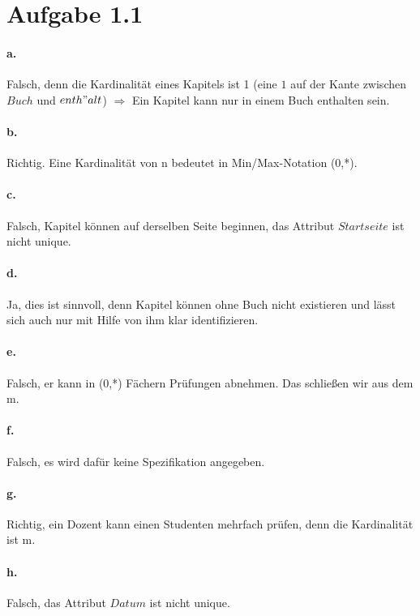 \documentclass{article}
\begin{document}
	
	
	
	
	\section*{Aufgabe 1.1}
	\paragraph*{a.} Falsch, denn die Kardinalität eines Kapitels ist 1 (eine $1$ auf der Kante zwischen $Buch$ und $enth"alt$) $\Rightarrow$ Ein Kapitel kann nur in einem Buch enthalten sein.
	
	\paragraph*{b.} Richtig. Eine Kardinalität von n bedeutet in Min/Max-Notation (0,*).
	
	\paragraph*{c.} Falsch, Kapitel können auf derselben Seite beginnen, das Attribut $Startseite$ ist nicht unique.
	
	\paragraph*{d.} Ja, dies ist sinnvoll, denn Kapitel können ohne Buch nicht existieren und lässt sich auch nur mit Hilfe von ihm klar identifizieren.
	
	\paragraph*{e.}Falsch, er kann in (0,*) Fächern Prüfungen abnehmen. Das schließen wir aus dem m.
	
	\paragraph*{f.}Falsch, es wird dafür keine Spezifikation angegeben.
	
	\paragraph*{g.}Richtig, ein Dozent kann einen Studenten mehrfach prüfen, denn die Kardinalität ist m. 
	
	\paragraph*{h.}Falsch, das Attribut $Datum$ ist nicht unique.
	
\end{document}

